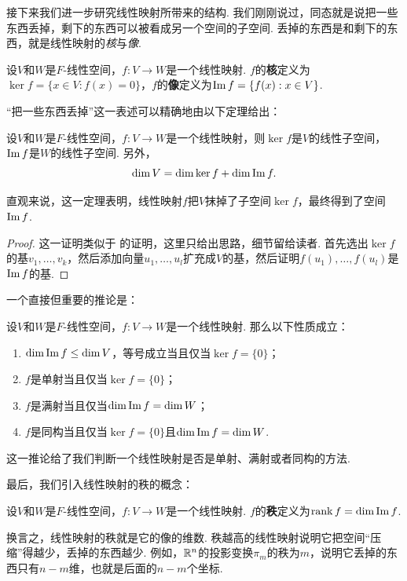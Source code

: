 接下来我们进一步研究线性映射所带来的结构. 我们刚刚说过，同态就是说把一些东西丢掉，剩下的东西可以被看成另一个空间的子空间. 丢掉的东西是和剩下的东西，就是线性映射的\emph{核}与\emph{像}. 

\begin{definition}[核与像]\label{def:kernel-image}
设$V$和$W$是$F$-线性空间，$f:V\to W$是一个线性映射. $f$的\textbf{核}定义为$\ker f=\{x\in V:f(x)=0\}$，$f$的\textbf{像}定义为$\operatorname*{Im} f=\{f(x):x\in V\}$. 
\end{definition}

“把一些东西丢掉”这一表述可以精确地由以下定理给出：

\begin{theorem}\label{thm:kernel-image-property}
设$V$和$W$是$F$-线性空间，$f:V\to W$是一个线性映射，则$\ker f$是$V$的线性子空间，$\operatorname*{Im} f$是$W$的线性子空间. 另外，
\[\dim V=\dim\ker f+\dim\operatorname*{Im} f.\]
\end{theorem}
直观来说，这一定理表明，线性映射$f$把$V$抹掉了子空间$\ker f$，最终得到了空间$\operatorname*{Im} f$. 
\begin{proof}
这一证明类似于 的证明，这里只给出思路，细节留给读者. 首先选出$\ker f$的基$v_1,\dots,v_k$，然后添加向量$u_1,\dots,u_l$扩充成$V$的基，然后证明$f(u_1),\dots,f(u_l)$是$\operatorname*{Im} f$的基. 
\end{proof}

一个直接但重要的推论是：
\begin{corollary}\label{cor:kernel-image-isomorphism}
设$V$和$W$是$F$-线性空间，$f:V\to W$是一个线性映射. 那么以下性质成立：
\begin{enumerate}
    \item $\dim \operatorname*{Im} f\leq \dim V$，等号成立当且仅当$\ker f=\{0\}$；
    \item $f$是单射当且仅当$\ker f=\{0\}$；
    \item $f$是满射当且仅当$\dim \operatorname*{Im} f=\dim W$；
    \item $f$是同构当且仅当$\ker f=\{0\}$且$\dim \operatorname*{Im} f=\dim W$. 
\end{enumerate}
\end{corollary}
这一推论给了我们判断一个线性映射是否是单射、满射或者同构的方法. 

最后，我们引入线性映射的秩的概念：
\begin{definition}[线性映射的秩]
设$V$和$W$是$F$-线性空间，$f:V\to W$是一个线性映射. $f$的\textbf{秩}定义为$\operatorname*{rank} f=\dim\operatorname*{Im} f$. 
\end{definition}

换言之，线性映射的秩就是它的像的维数. 秩越高的线性映射说明它把空间“压缩”得越少，丢掉的东西越少. 例如，$\mathbb{R}^n$的投影变换$\pi_m$的秩为$m$，说明它丢掉的东西只有$n-m$维，也就是后面的$n-m$个坐标. 


